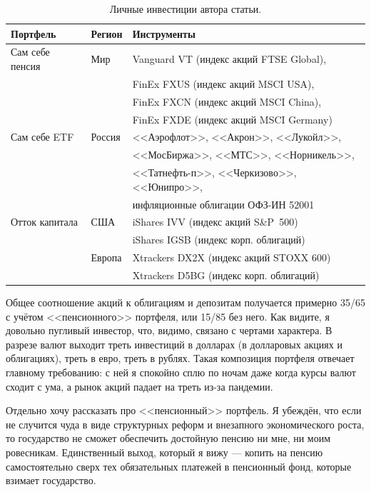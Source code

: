 \begin{table}[h!]
\centering
\begin{tabular}{l|l|l}
Портфель        & Регион & Инструменты \\
\hline
Сам себе пенсия & Мир    & Vanguard VT (индекс акций FTSE Global), \\
                &        & FinEx FXUS (индекс акций MSCI USA), \\ 
                &        & FinEx FXCN (индекс акций MSCI China), \\
                &        & FinEx FXDE (индекс акций MSCI Germany) \\
\hline
Сам себе ETF    & Россия & <<Аэрофлот>>, <<Акрон>>, <<Лукойл>>, \\
                &        & <<МосБиржа>>, <<МТС>>, <<Норникель>>,\\
                &        & <<Татнефть-п>>, <<Черкизово>>, <<Юнипро>>, \\
                &        & инфляционные облигации ОФЗ-ИН 52001 \\
\hline
Отток капитала  & США    & iShares IVV (индекс акций S\&P~500) \\
                &        & iShares IGSB (индекс корп. облигаций) \\
\cline{2-3}
                & Европа & Xtrackers DX2X (индекс акций STOXX 600) \\
                &        & Xtrackers D5BG (индекс корп. облигаций)
\end{tabular}
\caption{Личные инвестиции автора статьи.}
\label{personal_portfolios}
\end{table}

Общее соотношение акций к облигациям и депозитам получается примерно 35/65 с 
учётом <<пенсионного>> портфеля, или 15/85 без него. Как видите, я довольно 
пугливый инвестор, что, видимо, связано с чертами характера. В разрезе валют 
выходит треть инвестиций в долларах (в долларовых акциях и облигациях), треть в 
евро, треть в рублях. Такая композиция портфеля отвечает главному требованию: с 
ней я спокойно сплю по ночам даже когда курсы валют сходит с ума, а рынок акций 
падает на треть из-за пандемии.

Отдельно хочу рассказать про <<пенсионный>> портфель. Я убеждён, что если не 
случится чуда в виде структурных реформ и внезапного экономического роста, то 
государство не сможет обеспечить достойную пенсию ни мне, ни моим ровесникам. 
Единственный выход, который я вижу --- копить на пенсию самостоятельно сверх тех 
обязательных платежей в пенсионный фонд, которые взимает государство.

